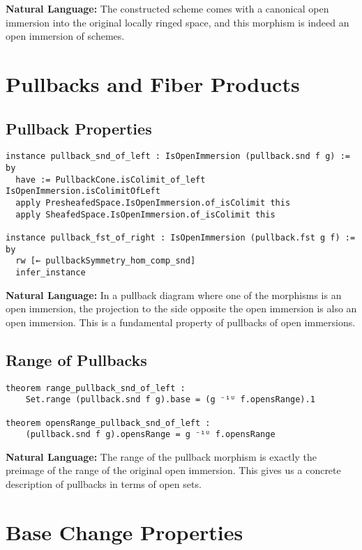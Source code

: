 \documentclass{article}
\theoremstyle{definition}
\begin{document}
\textbf{Natural Language:} The constructed scheme comes with a canonical open immersion into the original locally ringed space, and this morphism is indeed an open immersion of schemes.

\section{Pullbacks and Fiber Products}

\subsection{Pullback Properties}

\begin{lstlisting}
instance pullback_snd_of_left : IsOpenImmersion (pullback.snd f g) := by
  have := PullbackCone.isColimit_of_left IsOpenImmersion.isColimitOfLeft
  apply PresheafedSpace.IsOpenImmersion.of_isColimit this
  apply SheafedSpace.IsOpenImmersion.of_isColimit this

instance pullback_fst_of_right : IsOpenImmersion (pullback.fst g f) := by
  rw [← pullbackSymmetry_hom_comp_snd]
  infer_instance
\end{lstlisting}

\textbf{Natural Language:} In a pullback diagram where one of the morphisms is an open immersion, the projection to the side opposite the open immersion is also an open immersion. This is a fundamental property of pullbacks of open immersions.

\subsection{Range of Pullbacks}

\begin{lstlisting}
theorem range_pullback_snd_of_left :
    Set.range (pullback.snd f g).base = (g ⁻¹ᵁ f.opensRange).1

theorem opensRange_pullback_snd_of_left :
    (pullback.snd f g).opensRange = g ⁻¹ᵁ f.opensRange
\end{lstlisting}

\textbf{Natural Language:} The range of the pullback morphism is exactly the preimage of the range of the original open immersion. This gives us a concrete description of pullbacks in terms of open sets.

\section{Base Change Properties}
\end{document}
